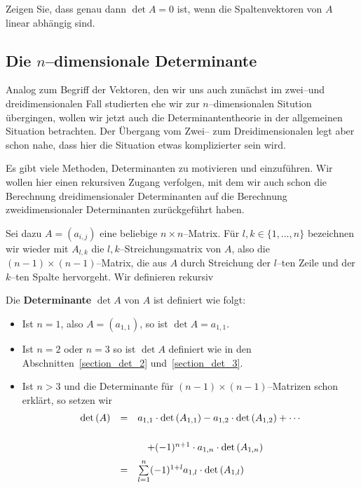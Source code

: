 \begin{aufgabe} Zeigen Sie, dass genau dann $\det{A} = 0$ ist, wenn die Spaltenvektoren von $A$ linear 
abhängig sind.
\end{aufgabe}

\bigbreak

\bigbreak

\subsection{Die $n$--dimensionale Determinante}\label{section_det_n}

\setcounter{definition}{0}
\setcounter{beispiel}{0}
\setcounter{notiz}{0}

Analog zum Begriff der Vektoren, den wir uns auch zunächst im zwei--und dreidimensionalen Fall studierten 
ehe wir zur $n$--dimensionalen Sitution übergingen, wollen wir jetzt auch die Determinantentheorie in der 
allgemeinen Situation betrachten. Der Übergang vom Zwei-- zum Dreidimensionalen legt aber schon nahe, dass 
hier die Situation etwas komplizierter sein wird. 

Es gibt viele Methoden, Determinanten zu motivieren und einzuführen. Wir wollen hier einen rekursiven 
Zugang verfolgen, mit dem wir auch schon die Berechnung dreidimensionaler Determinanten auf die Berechnung 
zweidimensionaler Determinanten zurückgeführt haben. 

Sei dazu $A = \left( a_{i,j} \right)$ eine beliebige $n \times n$--Matrix. Für  $l,k \in \{1, \ldots, n \}$ 
bezeichnen wir wieder mit $A_{l,k}$ die $l,k$--Streichungsmatrix von $A$, also die $(n-1) \times (n-1)$--Matrix, 
die aus $A$ durch Streichung der $l$--ten Zeile und der $k$--ten Spalte hervorgeht. Wir definieren rekursiv

\begin{definition}  
Die \textbf{Determinante} $\det{A}$ von $A$ ist definiert wie folgt:
\begin{itemize}
\item Ist $n =  1$, also $A = \left( a_{1,1} \right)$, so ist $\det{A} = a_{1,1}$.
\item Ist $n = 2$ oder $n=3$ so ist $\det{A}$ definiert wie in den 
Abschnitten~\ref{section_det_2} und~\ref{section_det_3}.
\item Ist $n > 3$ und die Determinante für $(n-1) \times (n-1)$--Matrizen schon erklärt, so setzen wir
  	$$ \begin{array} {l c l}
  	\det{A} & = &  a_{1,1} \cdot \det{A_{1,1}} - a_{1,2} \cdot \det{A_{1,2}} + \cdots \\
	& &  \quad + (-1)^{n+1} \cdot a_{1,n} \cdot \det{A_{1,n}} \\
	& = & \sum\limits_{l=1}^n (-1)^{1+l} a_{1,l} \cdot \det{A_{1,l}}
  	\end{array} $$
\end{itemize}
\end{definition}

